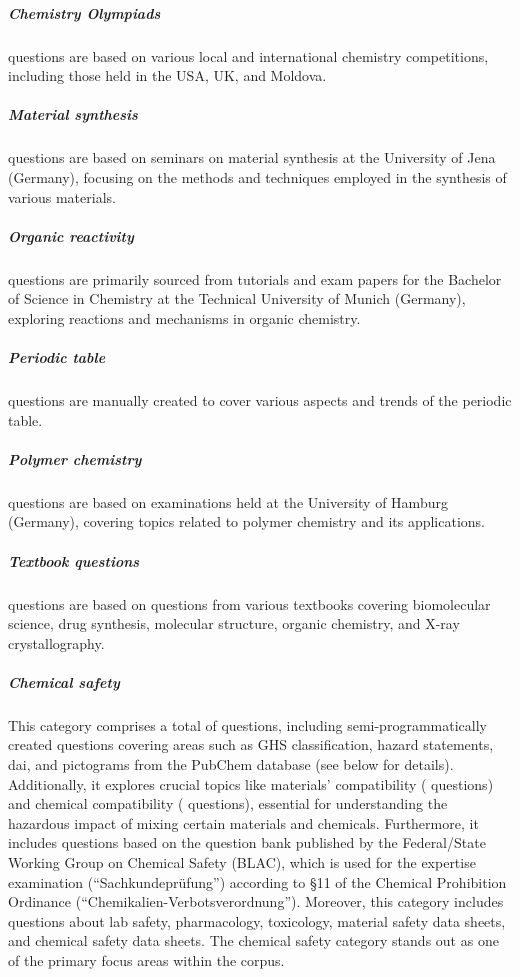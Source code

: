 \documentclass[11pt, oneside]{article}
\begin{document}
\begin{refsection}
\subparagraph{Chemistry Olympiads}
 questions are based on various local and international chemistry competitions, including those held in the USA, UK, and Moldova.

\subparagraph{Material synthesis}
 questions are based on seminars on material synthesis at the University of Jena (Germany), focusing on the methods and techniques employed in the synthesis of various materials.

\subparagraph{Organic reactivity}
  questions are primarily sourced from tutorials and exam papers for the Bachelor of Science in Chemistry at the Technical University of Munich (Germany), exploring reactions and mechanisms in organic chemistry.

\subparagraph{Periodic table}
 questions are manually created to cover various aspects and trends of the periodic table.

\subparagraph{Polymer chemistry}
 questions are based on examinations held at the University of Hamburg (Germany), covering topics related to polymer chemistry and its applications.

\subparagraph{Textbook questions}
 questions are based on questions from various textbooks covering biomolecular science, drug synthesis, molecular structure, organic chemistry, and X-ray crystallography.

\subparagraph{Chemical safety} 
This category comprises a total of  questions, including semi-programmatically created questions covering areas such as GHS classification, hazard statements, \gls{dai}, and pictograms from the PubChem database \autocite{pubchem} (see below for details). 
Additionally, it explores crucial topics like materials' compatibility ( questions) and chemical compatibility ( questions), essential for understanding the hazardous impact of mixing certain materials and chemicals. 
Furthermore, it includes  questions based on the question bank published by the Federal/State Working Group on Chemical Safety (BLAC), which is used for the expertise examination (\enquote{Sachkundeprüfung}) according to §11 of the Chemical Prohibition Ordinance (\enquote{Chemikalien-Verbotsverordnung}).
Moreover, this category includes questions about lab safety, pharmacology, toxicology, material safety data sheets, and chemical safety data sheets. 
The chemical safety category stands out as one of the primary focus areas within the \chembench corpus.


\end{refsection}
\end{document}
